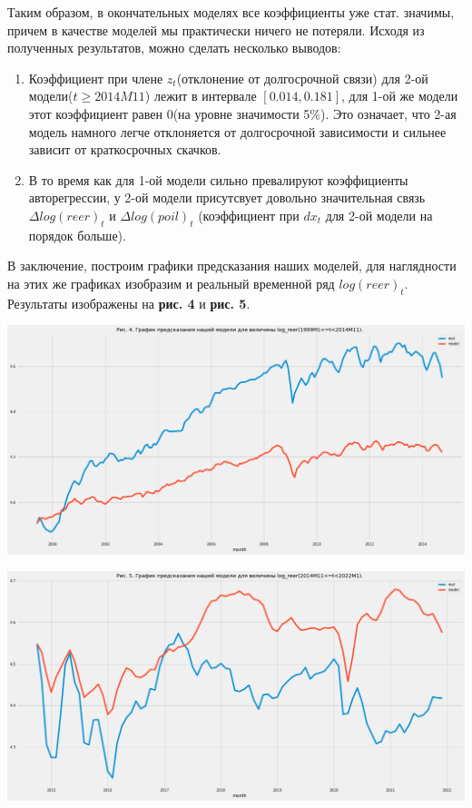 \documentclass{article}
\begin{document}
Таким образом, в окончательных моделях все коэффициенты уже стат. значимы, причем в качестве моделей мы практически ничего не потеряли. Исходя из полученных результатов, можно сделать несколько выводов:
\begin{enumerate}
\item Коэффициент при члене $z_t$(отклонение от долгосрочной связи) для 2-ой модели($t\geq 2014M11$) лежит в интервале $[0.014, 0.181]$, для 1-ой же модели этот коэффициент равен 0(на уровне значимости 5\%). Это означает, что 2-ая модель намного легче отклоняется от долгосрочной зависимости и сильнее зависит от краткосрочных скачков.
\item В то время как для 1-ой модели сильно превалируют коэффициенты авторегрессии, у 2-ой модели присутсвует довольно значительная связь $\Delta log(reer)_t$ и $\Delta log(poil)_t$ (коэффициент при $dx_t$ для 2-ой модели на порядок больше).
\end{enumerate}

В заключение, построим графики предсказания наших моделей, для наглядности на этих же графиках изобразим и реальный временной ряд $log(reer)_t$. Результаты изображены на \textbf{рис. 4} и \textbf{рис. 5}.

\begin{center}
\includegraphics[width=150mm]{pics/model_log_reer_1.png}
\end{center}

\begin{center}
\includegraphics[width=150mm]{pics/model_log_reer_2.png}
\end{center}
\end{document}
